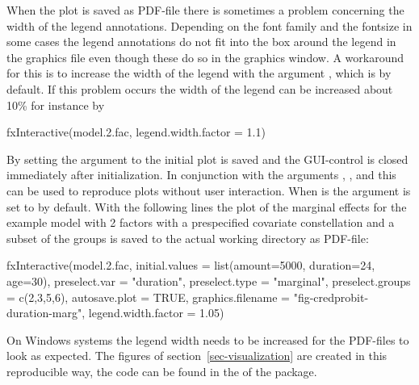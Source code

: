\documentclass[nojss]{jss}
\begin{document}
When the plot is saved as PDF-file there is sometimes a problem concerning the width of the legend annotations. Depending on the font family and the fontsize in some cases the legend annotations do not fit into the box around the legend in the graphics file even though these do so in the graphics window. A workaround for this is to increase the width of the legend with the argument , which is  by default. If this problem occurs the width of the legend can be increased about 10\% for instance by
%
\begin{Schunk}
\begin{Sinput}
 fxInteractive(model.2.fac, legend.width.factor = 1.1)
\end{Sinput}
\end{Schunk}
%

By setting the argument  to  the initial plot is saved and the GUI-control is closed immediately after initialization. In conjunction with the 
arguments , ,  and  this can be used to reproduce plots without user interaction. When  is  the argument  is set to  by default. With the following lines the plot of the marginal effects for the example model with 2 factors with a prespecified covariate constellation and a subset of the groups is saved to the actual working directory as PDF-file:
%
\begin{Schunk}
\begin{Sinput}
 fxInteractive(model.2.fac,
     initial.values      = list(amount=5000, duration=24, age=30), 
     preselect.var       = "duration",
     preselect.type      = "marginal",
     preselect.groups    = c(2,3,5,6),
     autosave.plot       = TRUE,
     graphics.filename   = "fig-credprobit-duration-marg",
     legend.width.factor = 1.05)
\end{Sinput}
\end{Schunk}
%

On Windows systems the legend width needs to be increased for the PDF-files to look as expected. The figures of section~\ref{sec-visualization} are created in this reproducible way, the code can be found in the  of the package.  
\end{document}
